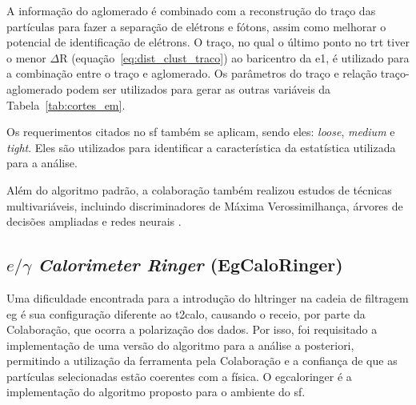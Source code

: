 A informação do aglomerado é combinado com a reconstrução do traço
\cite{physics_perf_expected} das partículas para fazer a separação de elétrons e fótons, assim como melhorar o
potencial de identificação de elétrons. O traço, no qual o último ponto no
\gls{trt} tiver o menor $\Delta\text{R}$ (equação~\ref{eq:dist_clust_traco}) ao baricentro da \gls{e1}, 
é utilizado para a combinação entre o traço e aglomerado. Os parâmetros do traço
e relação traço-aglomerado podem ser utilizados para gerar as outras variáveis
da Tabela~\ref{tab:cortes_em}.

Os requerimentos citados no \gls{sf} também se aplicam, sendo eles: \emph{loose}, 
\emph{medium} e \emph{tight}. Eles são utilizados para
identificar a característica da estatística utilizada para a análise.

Além do algoritmo padrão, a colaboração também realizou estudos de técnicas
multivariáveis, incluindo discriminadores de Máxima Verossimilhança, árvores 
de decisões ampliadas e redes neurais \cite{physics_perf_expected}.


\subsection{\texorpdfstring{$e/\gamma$ \emph{Calorimeter Ringer}
(EgCaloRinger)}{eGamma Calorimeter Ringer (EgCaloRinger)}}
\label{ssec:egringer}

Uma dificuldade encontrada para a introdução do \gls{hltringer} na cadeia de
filtragem \gls{eg} é sua configuração diferente ao \gls{t2calo}, causando o
receio, por parte da Colaboração, que ocorra a polarização dos dados. Por isso, foi requisitado a
implementação de uma versão do algoritmo para a análise a posteriori, permitindo
a utilização da ferramenta pela Colaboração e a confiança de que as partículas
selecionadas estão coerentes com a física. O \gls{egcaloringer} é a
implementação do algoritmo proposto para o ambiente do \gls{sf}.

